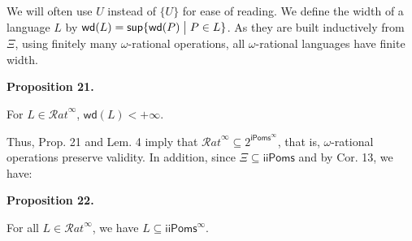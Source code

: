 \documentclass[10pt,a4paper]{article}
\begin{document}
 
  
We will often use $U$ instead of ${\{U\}}$ for ease of reading. We define the width of a language $L$ by $\mathsf{wd}(L)=\mathsf{sup}{\{\mathsf{wd}(P)\mathrel{\big{|}}P\in L\}}$. As they are built inductively from $\Xi$, using finitely many $\omega$-rational operations, all $\omega$-rational languages have finite width.\par
 
 
 
\par\medskip\noindent\textbf{Proposition 21.}\par
 
 
For $L\in{\mathcal{R}at}^{\infty}$, $\mathsf{wd}(L)<+\infty$.\par
 
 
 
 
Thus, Prop. 21 and Lem. 4 imply that ${\mathcal{R}at}^{\infty}\subseteq 2^{\mathsf{iPoms}^{\infty}}$, that is, $\omega$-rational operations preserve validity. In addition, since $\Xi\subseteq\mathsf{iiPoms}$ and by Cor. 13, we have:\par
 
 
 
\par\medskip\noindent\textbf{Proposition 22.}\par
 
 
For all $L\in{\mathcal{R}at}^{\infty}$, we have $L\subseteq{\mathsf{iiPoms}^{\infty}}$.\par
 
 
 
 
\end{document}
